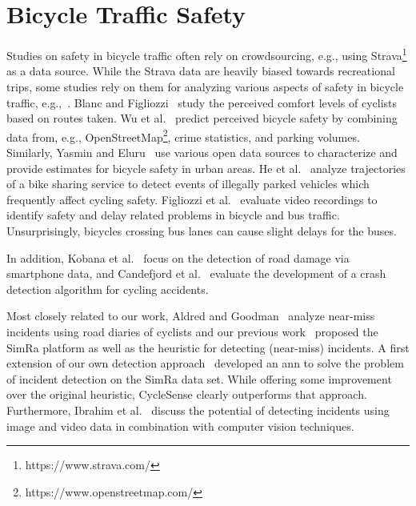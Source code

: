 \section{Bicycle Traffic Safety}
\label{sec:bicycle_traffic_safety_background}
Studies on safety in bicycle traffic often rely on crowdsourcing, e.g., using Strava\footnote{https://www.strava.com/} as a data source.
While the Strava data are heavily biased towards recreational trips, some studies rely on them for analyzing various aspects of safety in bicycle traffic, e.g.,~\cite{hochmair2019estimating,ferster2021strava}.
Blanc and Figliozzi~\cite{blanc2016modeling, blanc2017safety} study the perceived comfort levels of cyclists based on routes taken.
Wu et al.~\cite{wu2018predicting} predict perceived bicycle safety by combining data from, e.g., OpenStreetMap\footnote{https://www.openstreetmap.com/}, crime statistics, and parking volumes.
Similarly, Yasmin and Eluru~\cite{yasmin2016latent} use various open data sources to characterize and provide estimates for bicycle safety in urban areas.
He et al.~\cite{he2018detecting} analyze trajectories of a bike sharing service to detect events of illegally parked vehicles which frequently affect cycling safety.
Figliozzi et al.~\cite{figliozzi2019evaluation} evaluate video recordings to identify safety and delay related problems in bicycle and bus traffic.
Unsurprisingly, bicycles crossing bus lanes can cause slight delays for the buses.

In addition, Kobana et al.~\cite{kobana2014detection} focus on the detection of road damage via smartphone data, and Candefjord et al.~\cite{candefjord2014using} evaluate the development of a crash detection algorithm for cycling accidents.

Most closely related to our work, Aldred and Goodman~\cite{aldred2018predictors} analyze near-miss incidents using road diaries of cyclists and our previous work~\cite{karakaya2020simra} proposed the SimRa platform as well as the heuristic for detecting (near-miss) incidents.
A first extension of our own detection approach~\cite{sanchez2020detecting} developed an \ac{ann} to solve the problem of incident detection on the SimRa data set.
While offering some improvement over the original heuristic, CycleSense clearly outperforms that approach.
Furthermore, Ibrahim et al.~\cite{ibrahim2021cycling} discuss the potential of detecting incidents using image and video data in combination with computer vision techniques.
